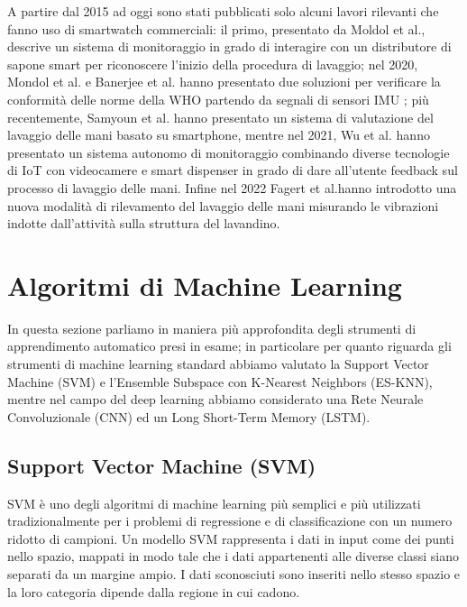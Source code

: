 A partire dal 2015 ad oggi sono stati pubblicati solo alcuni lavori rilevanti che fanno uso di smartwatch commerciali: il primo, presentato da Moldol et al., descrive un sistema di monitoraggio in grado di interagire con un distributore di sapone smart per riconoscere l'inizio della procedura di lavaggio\cite{mondol2015harmony}; nel 2020, Mondol et al. e Banerjee et al. hanno presentato due soluzioni per verificare la conformità delle norme della WHO partendo da segnali di sensori IMU \cite{mondol2020hawad}\cite{banerjee2020hand}; più recentemente, Samyoun et al. hanno presentato un sistema di valutazione del lavaggio delle mani basato su smartphone\cite{samyoun2021iwash}, mentre nel 2021, Wu et al. hanno presentato un sistema autonomo di monitoraggio combinando diverse tecnologie di IoT con videocamere e smart dispenser in grado di dare all'utente feedback sul processo di lavaggio delle mani. Infine nel 2022 Fagert et al.hanno introdotto una nuova modalità di rilevamento del lavaggio delle mani misurando le vibrazioni indotte dall'attività sulla struttura del lavandino\cite{fagert2022clean}.

\section{Algoritmi di Machine Learning}
\label{sec:algoritmi-di-machine-learning}

In questa sezione parliamo in maniera più approfondita degli strumenti di apprendimento automatico presi in esame; in particolare per quanto riguarda gli strumenti di machine learning standard abbiamo valutato la Support Vector Machine (SVM) e l'Ensemble Subspace con K-Nearest Neighbors (ES-KNN), mentre nel campo del deep learning abbiamo considerato una Rete Neurale Convoluzionale (CNN) ed un Long Short-Term Memory (LSTM).

\subsection{Support Vector Machine (SVM)}
\label{ssec:support-vector-machine}

SVM è uno degli algoritmi di machine learning più semplici e più utilizzati tradizionalmente per i problemi di regressione e di classificazione con un numero ridotto di campioni.
Un modello SVM rappresenta i dati in input come dei punti nello spazio, mappati in modo tale che i dati appartenenti alle diverse classi siano separati da un margine ampio. I dati sconosciuti sono inseriti nello stesso spazio e la loro categoria dipende dalla regione in cui cadono.

